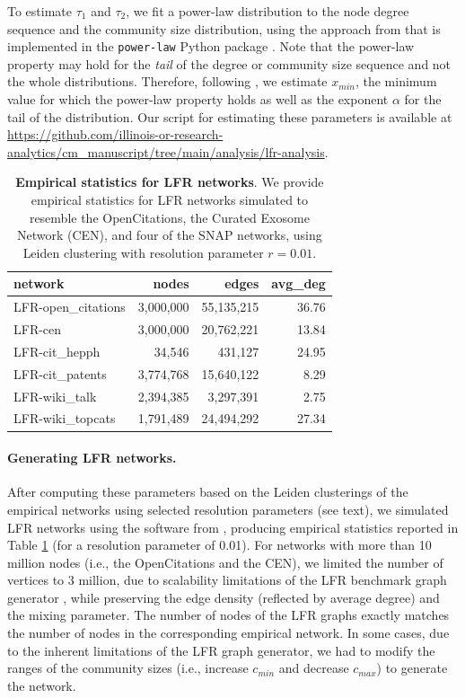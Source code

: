 \documentclass[11pt]{article}   	%
\begin{document}
To estimate $\tau_1$ and $\tau_2$, we fit a power-law distribution to the node degree sequence and the community size distribution, using the approach from \cite{clauset2009power} that is implemented in the \texttt{power-law} Python package \citep{alstott2014powerlaw}. Note that the power-law property may hold for the \textit{tail} of the degree or community size sequence and not the whole distributions. Therefore, following \cite{clauset2009power}, we estimate $x_{min}$, the minimum value for which the power-law property holds as well as the exponent $\alpha$ for the tail of the distribution. Our script for estimating these parameters is available at \href{https://github.com/illinois-or-research-analytics/cm_manuscript/tree/main/analysis/lfr-analysis}{https://github.com/illinois-or-research-analytics/cm\_manuscript/tree/main/analysis/lfr-analysis}.


\begin{table}[ht]
\caption{\textbf{Empirical statistics for LFR networks}. We provide empirical statistics for LFR networks simulated to  resemble the OpenCitations, the Curated Exosome Network (CEN), and four of the SNAP networks, using Leiden clustering with resolution parameter $r=0.01$. }
\centering
\begin{tabular}{lrrr}
  \hline
 network & nodes & edges & avg\_deg \\
  \hline
    LFR-open\_citations & 3,000,000  & 55,135,215 & 36.76 \\
    LFR-cen & 3,000,000 & 20,762,221 & 13.84 \\
    LFR-cit\_hepph &  34,546 & 431,127 & 24.95 \\
    LFR-cit\_patents & 3,774,768 & 15,640,122 & 8.29 \\
    LFR-wiki\_talk & 2,394,385 & 3,297,391 & 2.75 \\
    LFR-wiki\_topcats & 1,791,489 & 24,494,292 & 27.34 \\
 \hline
\end{tabular}
\label{tab:empirical-stats-LFR}
\end{table}

\paragraph{Generating LFR networks.}
After computing these parameters based on the Leiden clusterings of the empirical networks using selected resolution parameters (see text), we simulated LFR networks using the software from \cite{lancichinetti2008benchmark}, producing empirical statistics reported in Table \ref{tab:empirical-stats-LFR} (for a resolution parameter of 0.01). For networks with more than 10 million nodes (i.e., the OpenCitations and the CEN), we limited the number of vertices to 3 million, due to scalability limitations of  the LFR benchmark graph generator \citep{slota2019scalable}, while preserving the edge density (reflected by average degree) and the mixing parameter.  The number of nodes of the LFR graphs exactly matches the number of nodes in the corresponding empirical network. In some cases, due to the inherent limitations of the LFR graph generator, we had to modify the ranges of the community sizes (i.e., increase $c_{min}$ and decrease $c_{max}$) to generate the network.
\end{document}
